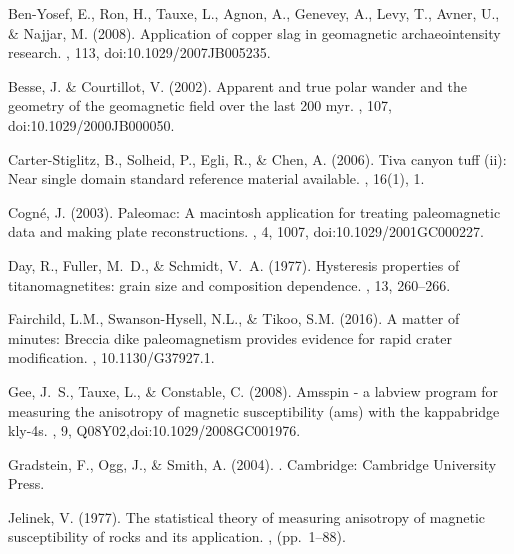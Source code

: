 \documentclass[11pt]{book}
\begin{document}
{{{{{{\begin{thebibliography}{}

Ben-Yosef, E., Ron, H., Tauxe, L., Agnon, A., Genevey, A., Levy, T., Avner, U.,
  \& Najjar, M. (2008).
\newblock Application of copper slag in geomagnetic archaeointensity research.
, 113, doi:10.1029/2007JB005235.

Besse, J. \& Courtillot, V. (2002).
\newblock Apparent and true polar wander and the geometry of the geomagnetic
  field over the last 200 myr.
, 107, doi:10.1029/2000JB000050.

Carter-Stiglitz, B., Solheid, P., Egli, R., \& Chen, A. (2006).
\newblock Tiva canyon tuff (ii): Near single domain standard reference material
  available.
, 16(1), 1.

Cogn\'e, J. (2003).
\newblock Paleomac: A macintosh application for treating paleomagnetic data and
  making plate reconstructions.
, 4, 1007, doi:10.1029/2001GC000227.

Day, R., Fuller, M.~D., \& Schmidt, V.~A. (1977).
\newblock Hysteresis properties of titanomagnetites: grain size and composition
  dependence.
, 13, 260--266.

Fairchild, L.M., Swanson-Hysell, N.L., \& Tikoo, S.M. (2016).
\newblock A matter of minutes: Breccia dike paleomagnetism provides evidence for rapid crater modification.
, 10.1130/G37927.1.

Gee, J.~S., Tauxe, L., \& Constable, C. (2008).
\newblock Amsspin - a labview program for measuring the anisotropy of magnetic
  susceptibility (ams) with the kappabridge kly-4s.
, 9, Q08Y02,doi:10.1029/2008GC001976.

Gradstein, F., Ogg, J., \& Smith, A. (2004).
.
\newblock Cambridge: Cambridge University Press.

Jelinek, V. (1977).
\newblock The statistical theory of measuring anisotropy of magnetic
  susceptibility of rocks and its application.
, (pp.\ 1--88).


\end{thebibliography}}}}}}}
\end{document}
